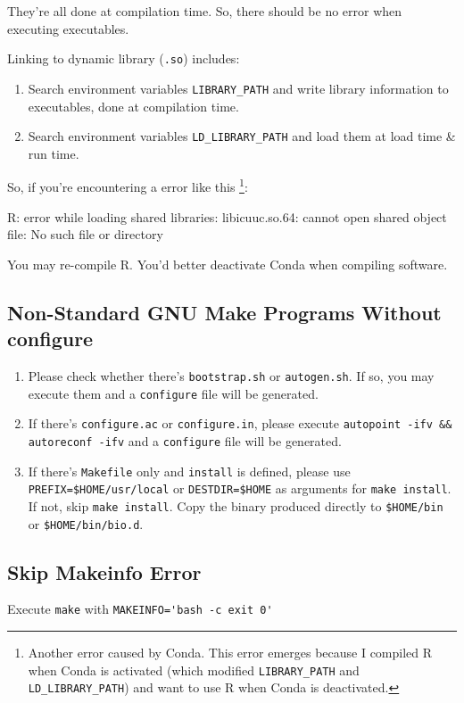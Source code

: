 \documentclass[]{article}
\begin{document}
They're all done at compilation time. So, there should be no error when executing executables.

Linking to dynamic library (\verb|.so|) includes:

\begin{enumerate}
\item Search environment variables \verb|LIBRARY_PATH| and write library information to executables, done at compilation time.
\item Search environment variables \verb|LD_LIBRARY_PATH| and load them at load time \& run time.
\end{enumerate}

So, if you're encountering a error like this \footnote{Another error caused by Conda. This error emerges because I compiled R when Conda is activated (which modified {\tt LIBRARY\_PATH} and {\tt LD\_LIBRARY\_PATH}) and want to use R when Conda is deactivated.}:

R: error while loading shared libraries: libicuuc.so.64: cannot open shared object file: No such file or directory

You may re-compile R. You'd better deactivate Conda when compiling software.

\subsection{Non-Standard GNU Make Programs Without configure}
\begin{enumerate}
\item Please check whether there's \verb|bootstrap.sh| or \verb|autogen.sh|. If so, you may execute them and a \verb|configure| file will be generated.
\item If there's \verb|configure.ac| or \verb|configure.in|, please execute \verb|autopoint -ifv &&  autoreconf -ifv| and a \verb|configure| file will be generated.
\item If there's \verb|Makefile| only and \verb|install| is defined, please use \verb|PREFIX=$HOME/usr/local| or \verb|DESTDIR=$HOME| as arguments for \verb|make install|. If not, skip \verb|make install|. Copy the binary produced directly to \verb|$HOME/bin| or \verb|$HOME/bin/bio.d|.
\end{enumerate}

\subsection{Skip Makeinfo Error}
Execute \verb|make| with \verb|MAKEINFO='bash -c exit 0'|
\end{document}
